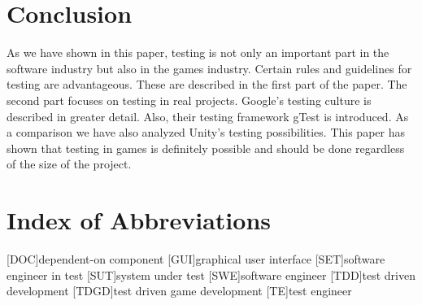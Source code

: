 






\section{Conclusion}
As we have shown in this paper, testing is not only an important part in the software industry but also in the games industry. Certain rules and guidelines for testing are advantageous. These are described in the first part of the paper. The second part focuses on testing in real projects. Google's testing culture is described in greater detail. Also, their testing framework gTest is introduced. As a comparison we have also analyzed Unity's testing possibilities. This paper has shown that testing in games is definitely possible and should be done regardless of the size of the project.

\section{Index of Abbreviations}
\begin{acronym}[XXXXX]
    [DOC]{dependent-on component}
    [GUI]{graphical user interface}
    [SET]{software engineer in test}
    [SUT]{system under test}
    [SWE]{software engineer}
    [TDD]{test driven development}
    [TDGD]{test driven game development}
    [TE]{test engineer}
\end{acronym}

%
%
%
%